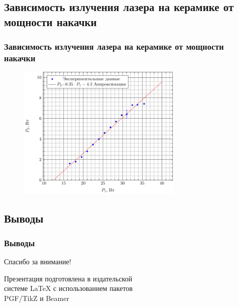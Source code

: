 \documentclass[10pt,pdf,hyperref={unicode}, dvipsnames]{beamer}
\newcommand\frametitless[1]{\subsection{#1}\frametitle{#1}}
\begin{document}
\begin{frame}[t]
	\frametitless{Зависимость излучения лазера на керамике от мощности накачки}
		\begin{figure}[tb]
		\centering
		\includegraphics[width=0.7\textwidth]{img/P2P}
	\end{figure}
\end{frame}
\begin{frame}
	\frametitless{Выводы}

\end{frame}


\begin{frame}[plain]
	\vspace{4cm}
	\begin{center}
		\Huge
		Спасибо за внимание!
	\end{center}
	\vspace{2.5cm}
	\begin{center}
		\color{black!30!white}
		Презентация подготовлена в издательской \\
		системе LaTeX с использованием пакетов \\
		PGF/TikZ и Beamer
	\end{center}
\end{frame}
\end{document}
